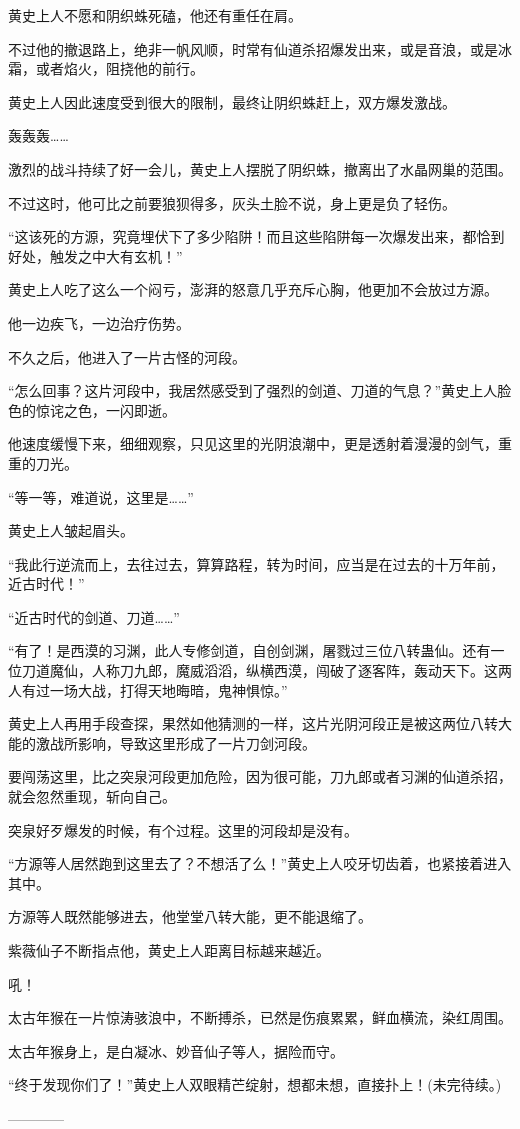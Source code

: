 \begin{this_body}
黄史上人不愿和阴织蛛死磕，他还有重任在肩。

不过他的撤退路上，绝非一帆风顺，时常有仙道杀招爆发出来，或是音浪，或是冰霜，或者焰火，阻挠他的前行。

黄史上人因此速度受到很大的限制，最终让阴织蛛赶上，双方爆发激战。

轰轰轰……

激烈的战斗持续了好一会儿，黄史上人摆脱了阴织蛛，撤离出了水晶网巢的范围。

不过这时，他可比之前要狼狈得多，灰头土脸不说，身上更是负了轻伤。

“这该死的方源，究竟埋伏下了多少陷阱！而且这些陷阱每一次爆发出来，都恰到好处，触发之中大有玄机！”

黄史上人吃了这么一个闷亏，澎湃的怒意几乎充斥心胸，他更加不会放过方源。

他一边疾飞，一边治疗伤势。

不久之后，他进入了一片古怪的河段。

“怎么回事？这片河段中，我居然感受到了强烈的剑道、刀道的气息？”黄史上人脸色的惊诧之色，一闪即逝。

他速度缓慢下来，细细观察，只见这里的光阴浪潮中，更是透射着漫漫的剑气，重重的刀光。

“等一等，难道说，这里是……”

黄史上人皱起眉头。

“我此行逆流而上，去往过去，算算路程，转为时间，应当是在过去的十万年前，近古时代！”

“近古时代的剑道、刀道……”

“有了！是西漠的习渊，此人专修剑道，自创剑渊，屠戮过三位八转蛊仙。还有一位刀道魔仙，人称刀九郎，魔威滔滔，纵横西漠，闯破了逐客阵，轰动天下。这两人有过一场大战，打得天地晦暗，鬼神惧惊。”

黄史上人再用手段查探，果然如他猜测的一样，这片光阴河段正是被这两位八转大能的激战所影响，导致这里形成了一片刀剑河段。

要闯荡这里，比之突泉河段更加危险，因为很可能，刀九郎或者习渊的仙道杀招，就会忽然重现，斩向自己。

突泉好歹爆发的时候，有个过程。这里的河段却是没有。

“方源等人居然跑到这里去了？不想活了么！”黄史上人咬牙切齿着，也紧接着进入其中。

方源等人既然能够进去，他堂堂八转大能，更不能退缩了。

紫薇仙子不断指点他，黄史上人距离目标越来越近。

吼！

太古年猴在一片惊涛骇浪中，不断搏杀，已然是伤痕累累，鲜血横流，染红周围。

太古年猴身上，是白凝冰、妙音仙子等人，据险而守。

“终于发现你们了！”黄史上人双眼精芒绽射，想都未想，直接扑上！(未完待续。)

------------

\end{this_body}

